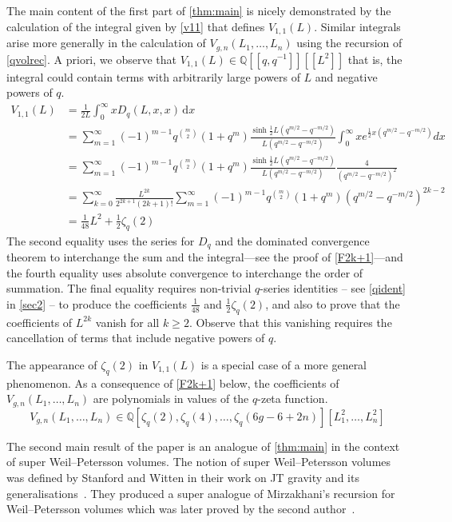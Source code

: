 \documentclass[a4paper]{article}
\theoremstyle{plain}
\theoremstyle{definition}
\newcommand{\dd}{\mathrm{d}}
\renewcommand{\geq}{\geqslant}
\newcommand{\bq}{\mathbb{Q}}
\begin{document}
The main content of the first part of \cref{thm:main} is nicely demonstrated by the calculation of the integral given by \cref{v11} that defines $V_{1,1}(L)$. Similar integrals arise more generally in the calculation of $V_{g,n}(L_1, \ldots, L_n)$ using the recursion of \cref{qvolrec}. A priori, we observe that $V_{1,1}(L) \in\bq[[q, q^{-1}]] [[L^2]]$ that is, the integral could contain terms with arbitrarily large powers of $L$ and negative powers of $q$.
\begin{align*}
V_{1,1}(L) &= \frac{1}{2L} \int_0^\infty \!\! x D_q(L,x,x) \, \dd x \\
&=\sum_{m=1}^\infty (-1)^{m-1}q^{\binom{m}{2}}(1+q^m)\frac{\sinh\frac12L(q^{m/2}-q^{-m/2})}{L(q^{m/2}-q^{-m/2})}
 \int_0^\infty xe^{\frac12x(q^{m/2}-q^{-m/2})}dx\\
 &=\sum_{m=1}^\infty (-1)^{m-1}q^{\binom{m}{2}}(1+q^m)\frac{\sinh\frac12L(q^{m/2}-q^{-m/2})}{L(q^{m/2}-q^{-m/2})}
\frac{4}{(q^{m/2}-q^{-m/2})^2}\\
&=\sum_{k=0}^\infty\frac{L^{2k}}{2^{2k+1}(2k+1)!}\sum_{m=1}^\infty(-1)^{m-1}q^{\binom{m}{2}}(1+q^m)(q^{m/2}-q^{-m/2})^{2k-2}\\
&=\frac{1}{48}L^2+\frac{1}{2}\zeta_q(2)
\end{align*}
The second equality uses the series for $D_q$ and the dominated convergence theorem to interchange the sum and the integral---see the proof of \cref{F2k+1}---and the fourth equality uses absolute convergence to interchange the order of summation. The final equality requires non-trivial $q$-series identities -- see \cref{qident} in \cref{sec2} -- to produce the coefficients $\frac{1}{48}$ and $\frac{1}{2}\zeta_q(2)$, and also to prove that the coefficients of $L^{2k}$ vanish for all $k \geq 2$. Observe that this vanishing requires the cancellation of terms that include negative powers of $q$.


The appearance of $\zeta_q(2)$ in $V_{1,1}(L)$ is a special case of a more general phenomenon. As a consequence of \cref{F2k+1} below, the coefficients of $V_{g,n}(L_1, \ldots, L_n)$ are polynomials in values of the $q$-zeta function.
\[
V_{g,n}(L_1, \ldots, L_n) \in \bq[\zeta_q(2), \zeta_q(4), \ldots, \zeta_q(6g-6+2n)] [L_1^2, \ldots, L_n^2]
\]


The second main result of the paper is an analogue of \cref{thm:main} in the context of super Weil--Petersson volumes. The notion of super Weil--Petersson volumes was defined by Stanford and Witten in their work on JT gravity and its generalisations~\cite{SWiJTG}. They produced a super analogue of Mirzakhani's recursion for Weil--Petersson volumes which was later proved by the second author~\cite{NorEnu}.
\end{document}
